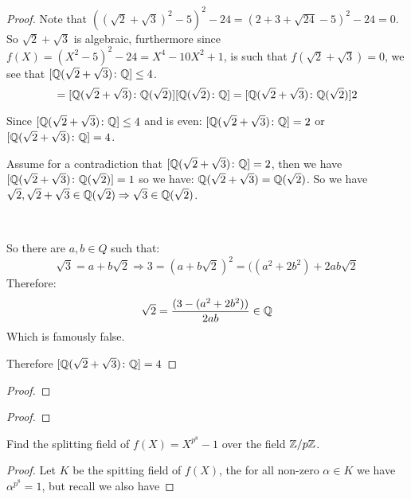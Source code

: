 \begin{exercise}
\begin{proof}
Note that $((\sqrt 2 +\sqrt 3)^2-5)^2-24 = (2 +3 + \sqrt{24} -5)^2-24 = 0$. So $\sqrt 2 + \sqrt 3$ is algebraic, furthermore since $f(X) = (X^2-5)^2-24 = X^4-10X^2+1$, is such that $f(\sqrt{2}+\sqrt{3}) = 0$, we see that $[\mathbb{Q}(\sqrt 2 +\sqrt 3)\colon \mathbb{Q}]\leq 4$. 
\begin{equation}
    [\Q(\sqrt 2 +\sqrt 3)\colon \Q] = [\Q(\sqrt 2 +\sqrt 3)\colon \Q(\sqrt{2})][\Q(\sqrt{2})\colon \Q] = [\Q(\sqrt 2 +\sqrt 3)\colon \Q(\sqrt{2})]2
\end{equation}

Since $[\mathbb{Q}(\sqrt 2 +\sqrt 3)\colon \mathbb{Q}]\leq 4$ and is even: $[\mathbb{Q}(\sqrt 2 +\sqrt 3)\colon \mathbb{Q}]=2$ or $[\mathbb{Q}(\sqrt 2 +\sqrt 3)\colon \mathbb{Q}]= 4$. 

Assume for a contradiction that $[\mathbb{Q}(\sqrt 2 +\sqrt 3)\colon \mathbb{Q}]=2$, then we have $[\mathbb{Q}(\sqrt 2 +\sqrt 3)\colon \mathbb{Q}(\sqrt{2})] = 1$ so we have: $\mathbb{Q}(\sqrt 2 +\sqrt 3)=\mathbb{Q}(\sqrt{2})$. So we have $\sqrt{2},\sqrt{2}+\sqrt{3}\in \mathbb{Q}(\sqrt{2}) \Rightarrow \sqrt{3}\in \mathbb{Q}(\sqrt{2})$.

\

So there are $a,b\in Q$ such that:\begin{equation}
    \sqrt{3} = a+b\sqrt{2} \Rightarrow 3 = (a+b\sqrt{2})^2 = ((a^2+2b^2) + 2ab\sqrt{2}
\end{equation}
Therefore:\begin{equation}
    \sqrt{2} = \frac{(3-(a^2+2b^2))}{2ab}\in \mathbb{Q}
\end{equation}
Which is famously false.

Therefore $[\mathbb{Q}(\sqrt 2 +\sqrt 3)\colon \mathbb{Q}]= 4$
\end{proof}
\end{exercise}

\begin{exercise}
\begin{proof}
    
\end{proof}
\end{exercise}


\begin{exercise}
\begin{proof}

\end{proof}
\end{exercise}
\begin{exercise} Find the splitting field of $f(X) = X^{p^8}-1$ over the field $\mathbb{Z}/p\mathbb{Z}$.
\begin{proof}
    Let $K$ be the spitting field of $f(X)$, the for all non-zero $\alpha\in K$ we have $\alpha^{p^8} = 1$, but recall we also have 
\end{proof}
\end{exercise}

